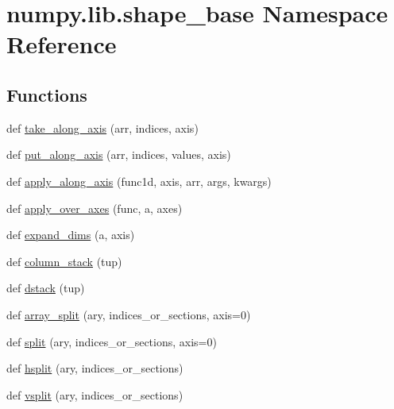 \hypertarget{namespacenumpy_1_1lib_1_1shape__base}{}\section{numpy.\+lib.\+shape\+\_\+base Namespace Reference}
\label{namespacenumpy_1_1lib_1_1shape__base}
\subsection*{Functions}
\begin{DoxyCompactItemize}
\item 
def \hyperlink{namespacenumpy_1_1lib_1_1shape__base_ac830db13ae6ed5702e2650b263dd479a}{take\+\_\+along\+\_\+axis} (arr, indices, axis)
\item 
def \hyperlink{namespacenumpy_1_1lib_1_1shape__base_a5c29e300011aff7533c045e73e7ce424}{put\+\_\+along\+\_\+axis} (arr, indices, values, axis)
\item 
def \hyperlink{namespacenumpy_1_1lib_1_1shape__base_a5f60485d92eeebf40d74ade43051bef2}{apply\+\_\+along\+\_\+axis} (func1d, axis, arr, args, kwargs)
\item 
def \hyperlink{namespacenumpy_1_1lib_1_1shape__base_ab25caaa9d9aad7a2495f5bf8dd5672b3}{apply\+\_\+over\+\_\+axes} (func, a, axes)
\item 
def \hyperlink{namespacenumpy_1_1lib_1_1shape__base_ab6c13a41184cfe5841e1e8d50a06a8f1}{expand\+\_\+dims} (a, axis)
\item 
def \hyperlink{namespacenumpy_1_1lib_1_1shape__base_a223be1f5270e217c41528fbec2131c43}{column\+\_\+stack} (tup)
\item 
def \hyperlink{namespacenumpy_1_1lib_1_1shape__base_a0bed809dc8726e451e41ee6b77577ddb}{dstack} (tup)
\item 
def \hyperlink{namespacenumpy_1_1lib_1_1shape__base_a783a47e5d4c03f1ed6276f74b3b538c1}{array\+\_\+split} (ary, indices\+\_\+or\+\_\+sections, axis=0)
\item 
def \hyperlink{namespacenumpy_1_1lib_1_1shape__base_add2346abe66e81efc9bc958f18abf3d9}{split} (ary, indices\+\_\+or\+\_\+sections, axis=0)
\item 
def \hyperlink{namespacenumpy_1_1lib_1_1shape__base_a92089da3ec9c284aae7450f6fc98b701}{hsplit} (ary, indices\+\_\+or\+\_\+sections)
\item 
def \hyperlink{namespacenumpy_1_1lib_1_1shape__base_a24b4c2509402097020e58f4e855c303f}{vsplit} (ary, indices\+\_\+or\+\_\+sections)
\item 

\end{DoxyCompactItemize}
